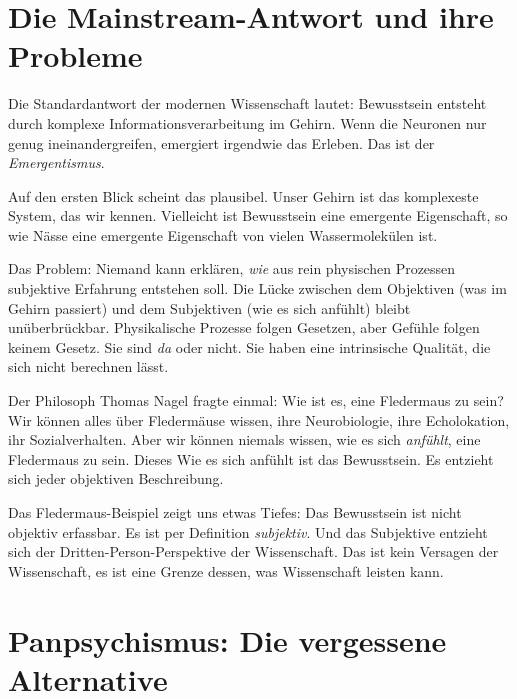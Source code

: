 \section{Die Mainstream-Antwort und ihre Probleme}

Die Standardantwort der modernen Wissenschaft lautet: Bewusstsein entsteht durch komplexe Informationsverarbeitung im Gehirn. Wenn die Neuronen nur genug ineinandergreifen, \glqq emergiert\grqq{} irgendwie das Erleben. Das ist der \emph{Emergentismus}.

Auf den ersten Blick scheint das plausibel. Unser Gehirn ist das komplexeste System, das wir kennen. Vielleicht ist Bewusstsein eine emergente Eigenschaft, so wie Nässe eine emergente Eigenschaft von vielen Wassermolekülen ist.

Das Problem: Niemand kann erklären, \emph{wie} aus rein physischen Prozessen subjektive Erfahrung entstehen soll. Die Lücke zwischen dem Objektiven (was im Gehirn passiert) und dem Subjektiven (wie es sich anfühlt) bleibt unüberbrückbar. Physikalische Prozesse folgen Gesetzen, aber Gefühle folgen keinem Gesetz. Sie sind \emph{da} oder nicht. Sie haben eine intrinsische Qualität, die sich nicht berechnen lässt.

\begin{bsp}
	Der Philosoph Thomas Nagel \cite{Nagel1974} fragte einmal: Wie ist es, eine Fledermaus zu sein? Wir können alles über Fledermäuse wissen, ihre Neurobiologie, ihre Echolokation, ihr Sozialverhalten. Aber wir können niemals wissen, wie es sich \emph{anfühlt}, eine Fledermaus zu sein. Dieses \glqq Wie es sich anfühlt\grqq{} ist das Bewusstsein. Es entzieht sich jeder objektiven Beschreibung.
\end{bsp}

Das Fledermaus-Beispiel zeigt uns etwas Tiefes: Das Bewusstsein ist nicht objektiv erfassbar. Es ist per Definition \emph{subjektiv}. Und das Subjektive entzieht sich der Dritten-Person-Perspektive der Wissenschaft. Das ist kein Versagen der Wissenschaft, es ist eine Grenze dessen, was Wissenschaft leisten kann.

\section{Panpsychismus: Die vergessene Alternative}


